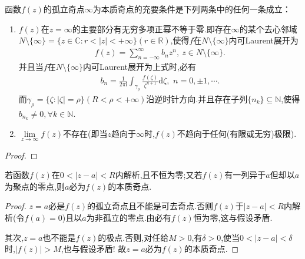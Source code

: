 \documentclass[../../main.tex]{subfiles}%
\begin{document}
\begin{theorem}
函数$f(z)$的孤立奇点$\infty$为本质奇点的充要条件是下列两条中的任何一条成立：
\begin{enumerate}[(1)]
\item $f(z)$在$z=\infty$的主要部分有无穷多项正幂不等于零.即存在$\infty$的某个去心邻域$N\setminus \{\infty\}=\{z\in \mathbb{C}:r<|z|<+\infty\}(r\in \mathbb{R})$,使得\( f \)在$N\setminus \{\infty\}$内可Laurent展开为
\begin{align*}
f(z)=\sum_{n=-\infty}^{\infty}{b_n z^n},\ z\in N\setminus\{\infty\}.
\end{align*}
并且当\( f \)在$N\setminus \{\infty\}$内可Laurent展开为上式时,必有
\begin{align*}
b_n=\frac{1}{2\pi \mathrm{i}}\int_{\gamma _{\rho}}{\frac{f\left( \zeta \right)}{\zeta^{n+1}}\mathrm{d}\zeta},\,\,n=0,\pm 1,\cdots .
\end{align*}
而\( \gamma_{\rho} = \{ \zeta: |\zeta| = \rho \} \)\( (R < \rho <+\infty )\)沿逆时针方向.并且存在子列$\{n_k\}\subseteq \mathbb{N}$,使得$b_{n_k}\neq 0,\forall k\in \mathbb{N}.$

\item $\lim\limits_{z \to \infty}f(z)$不存在(即当$z$趋向于$\infty$时,$f(z)$不趋向于任何(有限或无穷)极限).
\end{enumerate}
\end{theorem}
\begin{proof}

\end{proof}

\begin{theorem}\label{theorem:零点的聚点是本性奇点}
若函数$f(z)$在$0<|z-a|<R$内解析,且不恒为零;又若$f(z)$有一列异于$a$但却以$a$为聚点的零点,则$a$必为$f(z)$的本质奇点.
\end{theorem}
\begin{proof}

$z=a$必是$f(z)$的孤立奇点且不能是可去奇点.否则$f(z)$于$|z-a|<R$内解析(令$f(a)=0$)且以$a$为非孤立的零点.由必有$f(z)$恒为零,这与假设矛盾.

其次,$z=a$也不能是$f(z)$的极点.否则,对任给$M>0$,有$\delta>0$,使当$0<|z-a|<\delta$时,$|f(z)|>M$,也与假设矛盾!
故$z=a$必为$f(z)$的本质奇点.
\end{proof}
\end{document}
